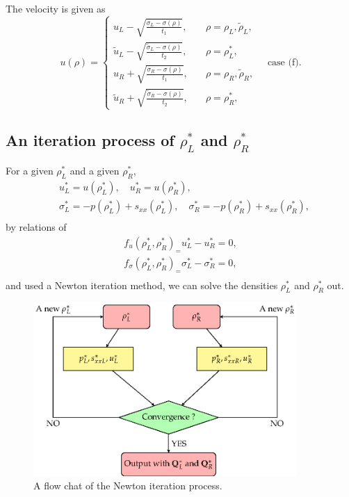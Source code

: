 \documentclass[review]{elsarticle}
\begin{document}
The velocity is given as
\begin{equation}
  u(\rho) = \left\{ \begin{array}{ll}
	  u_L -\sqrt{\frac{\sigma_L-\sigma(\rho)}{t_1}}, \quad &\rho = \rho_L,\tilde{\rho}_L,\\ 
	  \tilde{u}_L -\sqrt{\frac{\tilde{\sigma}_L-\sigma(\rho)}{t_2}}, \quad &\rho = \rho_L^*,\\ 
	  u_R +\sqrt{\frac{\sigma_R-\sigma(\rho)}{t_1}}, \quad &\rho = \rho_R, \tilde{\rho}_R, \\ 
	\tilde{u}_R +\sqrt{\frac{\tilde{\sigma}_R-\sigma(\rho)}{t_2}}, \quad &\rho = \rho_R^*, \end{array}
  \right. \quad \text{case (f)}.
\end{equation}



  \subsection{An iteration process of $\rho^*_L$ and $\rho^*_R$}\label{sec:iteration}

For a given  $\rho_L^*$ and a given $\rho_R^*$,
\begin{equation}
  \begin{aligned}
 & u_L^* = u(\rho_L^*),\quad u_R^*= u(\rho_R^*) ,\\
 & \sigma_L^* = -p(\rho_L^*)+s_{xx}(\rho_L^*),\quad \sigma_R^*= -p(\rho_R^*)+s_{xx}(\rho_R^*) ,\\
\end{aligned}
\end{equation}
 by relations of 
\begin{equation}
  \begin{aligned}
	f_u(\rho_L^*,\rho_R^*)_=  u_L^* -u_R^* =0,\\ 
	f_\sigma(\rho_L^*,\rho_R^*)_=  \sigma_L^* -\sigma_R^* =0,\\ 
\end{aligned}
\end{equation}
and used a Newton iteration method, we can solve the densities $\rho_L^*$ and $\rho_R^*$ out.
\begin{figure}
  \centering
  \includegraphics[width= 10cm] {Tikz-figure6.eps}
  \caption{A flow chat of the Newton iteration process.}
  \label{fig:newton}
\end{figure}
\end{document}
